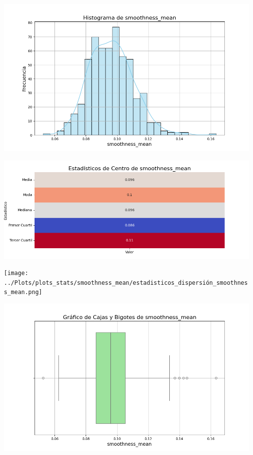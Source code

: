 \documentclass[a4paper, 12pt]{article}
\begin{document}
	\includegraphics[width=\textwidth]{../Plots/plots_stats/smoothness_mean/histograma_smoothness_mean.png}




\includegraphics[width=\textwidth]{../Plots/plots_stats/smoothness_mean/estadisticas_centro_smoothness_mean.png}




\texttt{[image: ../Plots/plots\_stats/smoothness\_mean/estadisticos\_dispersión\_smoothness\_mean.png]}



\includegraphics[width=\textwidth]{../Plots/plots_stats/smoothness_mean/boxplot_smoothness_mean.png}
\end{document}
